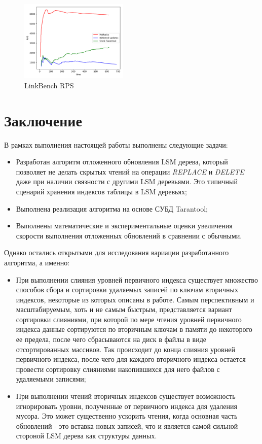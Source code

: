 \documentclass[a4paper,hidelinks,12pt]{article}
\begin{document}
\begin{figure}
\centering
\includegraphics[width=0.46\textwidth]{linkbench}
\caption{LinkBench RPS}
\label{fig:linkbench}
\end{figure}

\section{Заключение}
В рамках выполнения настоящей работы выполнены следующие задачи:
\begin{itemize}
\item Разработан алгоритм отложенного обновления LSM дерева, который позволяет
не делать скрытых чтений на операции \textit{REPLACE} и \textit{DELETE} даже при
наличии связности с другими LSM деревьями. Это типичный сценарий хранения
индексов таблицы в LSM деревьях;
\item Выполнена реализация алгоритма на основе СУБД Tarantool;
\item Выполнены математические и экспериментальные оценки увеличения скорости
выполнения отложенных обновлений в сравнении с обычными.
\end{itemize}

Однако остались открытыми для исследования вариации разработанного алгоритма, а
именно:
\begin{itemize}
\item При выполнении слияния уровней первичного индекса существует множество
способов сбора и сортировки удаляемых записей по ключам вторичных индексов,
некоторые из которых описаны в работе. Самым перспективным и масштабируемым,
хоть и не самым быстрым, представляется вариант сортировки слияниями, при
которой по мере чтения уровней первичного индекса данные сортируются по
вторичным ключам в памяти до некоторого ее предела, после чего сбрасываются на
диск в файлы в виде отсортированных массивов. Так происходит до конца слияния
уровней первичного индекса, после чего для каждого вторичного индекса остается
провести сортировку слияниями накопившихся для него файлов с удаляемыми
записями;
\item При выполнении чтений вторичных индексов существует возможность
игнорировать уровни, полученные от первичного индекса для удаления мусора. Это
может существенно ускорить чтения, когда основная часть обновлений - это вставка
новых записей, что и является самой сильной стороной LSM дерева как структуры
данных.
\end{itemize}
\end{document}
